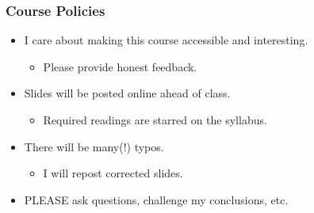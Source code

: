 \documentclass[english,xcolor=svgnames]{beamer}
\begin{document}
\begin{frame}
\frametitle{Course Policies}
\begin{itemize}
	\item I care about making this course accessible and interesting.
	\begin{itemize}
		\item Please provide honest feedback.
	\end{itemize}
	\item Slides will be posted online ahead of class.
	\begin{itemize}
		\item Required readings are starred on the syllabus.
	\end{itemize}
	\item There will be many(!) typos.
	\begin{itemize}
		\item I will repost corrected slides.
	\end{itemize}
	\item PLEASE ask questions, challenge my conclusions, etc.
\end{itemize}
\end{frame}
\end{document}
